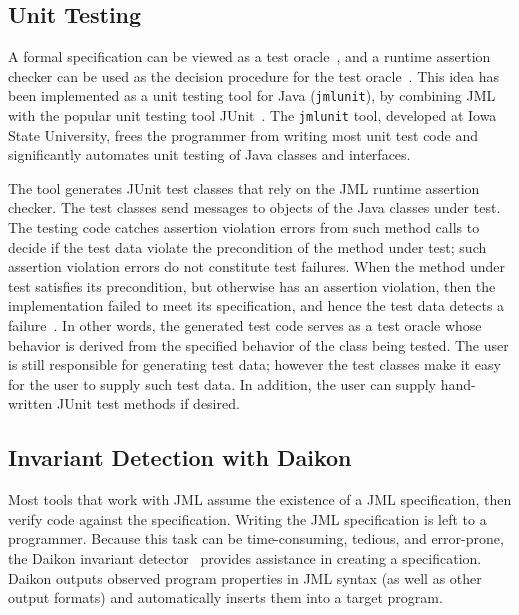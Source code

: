 \subsection{Unit Testing}
\label{jmlunit}

A formal specification can be viewed as a test
oracle~\cite{Peters-Parnas98,Antoy-Hamlet00}, and a runtime assertion
checker can be used as the decision procedure for the test
oracle~\cite{Cheon-Leavens02}.  This idea has been implemented as a
unit testing tool for Java (\texttt{jmlunit}), by combining JML with
the popular unit testing tool JUnit~\cite{Beck-Gamma98}.  The
\texttt{jmlunit} tool, developed at Iowa State University, frees the
programmer from writing most unit test code and significantly
automates unit testing of Java classes and interfaces.

The tool generates JUnit test classes that rely on the JML runtime
assertion checker.  The test classes send messages to objects of the
Java classes under test.  The testing code catches assertion violation
errors from such method calls to decide if the test data violate the
precondition of the method under test; such assertion violation errors
do not constitute test failures.  When the method under test satisfies
its precondition, but otherwise has an assertion violation, then the
implementation failed to meet its specification, and hence the test
data detects a failure~\cite{Cheon-Leavens02}.  In other words, the
generated test code serves as a test oracle whose behavior is derived
from the specified behavior of the class being tested.  The user is
still responsible for generating test data; however the test classes
make it easy for the user to supply such test data. In addition, the
user can supply hand-written JUnit test methods if desired.

\subsection{Invariant Detection with Daikon}
\label{daikon}

Most tools that work with JML assume the existence of a JML
specification, then verify code against the specification.  Writing
the JML specification is left to a programmer.  Because this task can
be time-consuming, tedious, and error-prone, the Daikon invariant
detector~\cite{Ernst2000:PhD,ErnstCGN2001:TSE} provides assistance in
creating a specification.  Daikon outputs observed program properties
in JML syntax (as well as other output formats) and automatically inserts
them into a target program.

